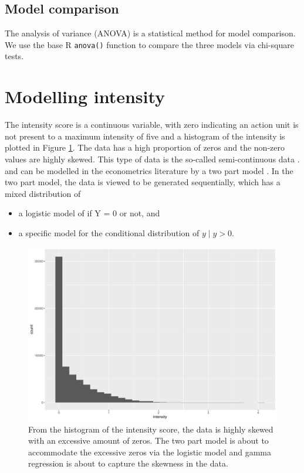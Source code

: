 \documentclass{monashthesis}
\begin{document}
\hypertarget{model-comparison}{%
\subsection{Model comparison}\label{model-comparison}}

The analysis of variance (ANOVA) \autocites{faraway2016extending}{gelman2006data} is a statistical method for model comparison. We use the base R \texttt{anova()} function to compare the three models via chi-square tests.

\hypertarget{modelling-intensity}{%
\section{Modelling intensity}\label{modelling-intensity}}

The intensity score is a continuous variable, with zero indicating an action unit is not present to a maximum intensity of five and a histogram of the intensity is plotted in Figure \ref{fig:intensity}. The data has a high proportion of zeros and the non-zero values are highly skewed. This type of data is the so-called semi-continuous data \autocite{twopart2010}. and can be modelled in the econometrics literature by a two part model \autocite{cragg1971some}. In the two part model, the data is viewed to be generated sequentially, which has a mixed distribution of

\begin{itemize}
\tightlist
\item
  a logistic model of if Y = 0 or not, and
\item
  a specific model for the conditional distribution of \(y \mid y > 0\).
\end{itemize}

\begin{figure}

{\centering \includegraphics[width=1\linewidth]{figures/intensity-1} 

}

\caption{From the histogram of the intensity score, the data is highly skewed with an excessive amount of zeros. The two part model is about to accommodate the excessive zeros via the logistic model and gamma regression is about to capture the skewness in the data.}\label{fig:intensity}
\end{figure}
\end{document}
